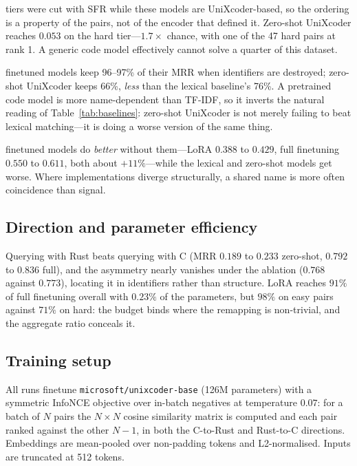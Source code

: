  tiers were
cut with SFR while these models are UniXcoder-based, so the ordering is a
property of the pairs, not of the encoder that defined it. Zero-shot UniXcoder
reaches $0.053$ on the hard tier---$1.7\times$ chance, with one of the 47 hard
pairs at rank 1. A generic code model effectively cannot solve a quarter of
this dataset.

 finetuned models keep
96--97\% of their MRR when identifiers are destroyed; zero-shot UniXcoder
keeps 66\%, \emph{less} than the lexical baseline's 76\%. A pretrained code
model is more name-dependent than TF-IDF, so it inverts the natural reading of
Table~\ref{tab:baselines}: zero-shot UniXcoder is not merely failing to beat
lexical matching---it is doing a worse version of the same thing.

 finetuned models do
\emph{better} without them---LoRA $0.388$ to $0.429$, full finetuning $0.550$ to
$0.611$, both about $+11\%$---while the lexical and zero-shot models get worse.
Where implementations diverge structurally, a shared name is more often
coincidence than signal.

\subsection{Direction and parameter efficiency}

Querying with Rust beats querying with C (MRR $0.189$ to $0.233$ zero-shot,
$0.792$ to $0.836$ full), and the asymmetry nearly vanishes under the ablation
($0.768$ against $0.773$), locating it in identifiers rather than structure.
LoRA reaches $91\%$ of full finetuning overall with $0.23\%$ of the parameters,
but $98\%$ on easy pairs against $71\%$ on hard: the budget binds where the
remapping is non-trivial, and the aggregate ratio conceals it.

\ifextended
\subsection{Training setup}

All runs finetune \texttt{microsoft/unixcoder-base} (126M parameters) with a
symmetric InfoNCE objective over in-batch negatives at temperature $0.07$:
for a batch of $N$ pairs the $N \times N$ cosine similarity matrix is computed
and each pair ranked against the other $N-1$, in both the C-to-Rust and
Rust-to-C directions. Embeddings are mean-pooled over non-padding tokens and
L2-normalised. Inputs are truncated at 512 tokens.

